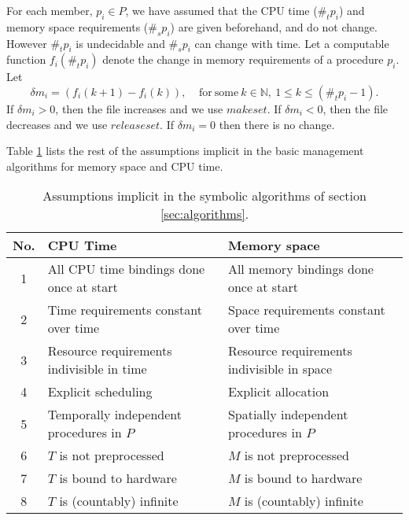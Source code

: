 \documentclass[draft]{article}
\begin{document}
For  each member,  $p_i \in  P$,  we have  assumed that  the CPU  time
($\#_tp_i$)  and  memory  space  requirements  ($\#_sp_i$)  are  given
beforehand, and  do not change.  However $\#_tp_i$  is undecidable and
$\#_sp_i$   can  change   with  time.    Let  a   computable  function
$f_i(\#_tp_i)$ denote the change in memory requirements of a procedure
$p_i$.  Let
\begin{equation}
  \label{eq:dynamic:mem}
  \delta m_i = (f_i(k + 1) - f_i(k)),\ \ \ \ \ \mathrm{for\
    some}\ k \in \mathbb{N},\  1 \le k \le (\#_tp_i - 1).
\end{equation}
If $\delta m_i > 0$, then the file increases and we use $makeset$.  If
$\delta m_i < 0$, then the file decreases and we use $releaseset$.  If
$\delta m_i = 0$ then there is no change.

Table \ref{tab:assumptions} lists the rest of the assumptions implicit
in the basic management algorithms for memory space and CPU time.
\begin{table}[t]
  \begin{center}
    \begin{tabular}[h]{|c|l|l|}
      \hline
      \textbf{No.} & \textbf{CPU Time} & \textbf{Memory space} \\
      \hline
      1 &
      All CPU time bindings done once at start &
      All memory bindings done once at start \\
      2 &
      Time requirements constant over time &
      Space requirements constant over time \\
      3 &
      Resource requirements indivisible in time &
      Resource requirements indivisible in space \\
      4 &
      Explicit scheduling &
      Explicit allocation \\
      5 &
      Temporally independent procedures in $P$ &
      Spatially independent procedures in $P$  \\
      6 &
      $T$ is not preprocessed &
      $M$ is not preprocessed \\
      7 &
      $T$ is bound to hardware &
      $M$ is bound to hardware \\
      8 &
      $T$ is (countably) infinite &
      $M$ is (countably) infinite \\
      \hline
    \end{tabular}
  \end{center}
  \caption[Implicit assumptions]{Assumptions implicit in the symbolic
  algorithms of section \ref{sec:algorithms}.}
  \label{tab:assumptions}
\end{table}
\end{document}
